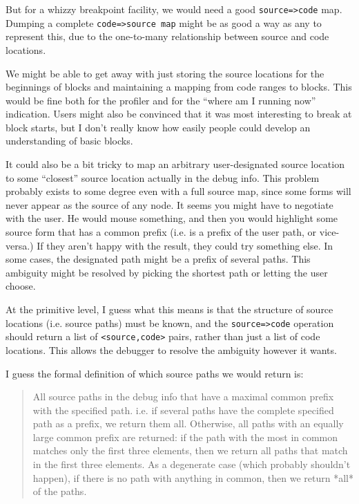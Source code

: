 

But for a whizzy breakpoint facility, we would need a good \verb+source=>code+ map.
Dumping a complete \verb+code=>source map+ might be as good a way as any to represent
this, due to the one-to-many relationship between source and code locations.

We might be able to get away with just storing the source locations for the
beginnings of blocks and maintaining a mapping from code ranges to blocks.
This would be fine both for the profiler and for the ``where am I running now''
indication.  Users might also be convinced that it was most interesting to
break at block starts, but I don't really know how easily people could develop
an understanding of basic blocks.

It could also be a bit tricky to map an arbitrary user-designated source
location to some ``closest'' source location actually in the debug info.
This problem probably exists to some degree even with a full source map, since
some forms will never appear as the source of any node.  It seems you might
have to negotiate with the user.  He would mouse something, and then you would
highlight some source form that has a common prefix (i.e. is a prefix of the
user path, or vice-versa.)  If they aren't happy with the result, they could
try something else.  In some cases, the designated path might be a prefix of
several paths.  This ambiguity might be resolved by picking the shortest path
or letting the user choose.

At the primitive level, I guess what this means is that the structure of source
locations (i.e. source paths) must be known, and the \verb+source=>code+ operation
should return a list of \verb+<source,code>+ pairs, rather than just a list of code
locations.  This allows the debugger to resolve the ambiguity however it wants.

I guess the formal definition of which source paths we would return
is:
\begin{quote}
    All source paths in the debug info that have a maximal common prefix with
    the specified path.  i.e. if several paths have the complete specified path
    as a prefix, we return them all.  Otherwise, all paths with an equally
    large common prefix are returned: if the path with the most in common
    matches only the first three elements, then we return all paths that match
    in the first three elements.  As a degenerate case (which probably
    shouldn't happen), if there is no path with anything in common, then we
    return *all* of the paths.
\end{quote}



